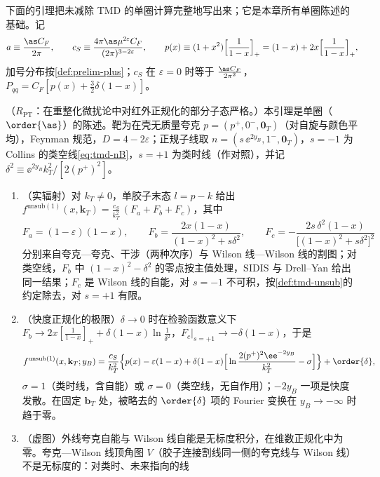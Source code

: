 下面的引理把未减除 TMD 的单圈计算完整地写出来；它是本章所有单圈陈述的基础。记
\begin{equation}\label{eq:tmd-oneloop-notation}
a\equiv\frac{\as C_F}{2\pi},\qquad c_S\equiv\frac{4\pi\as\mu^{2\varepsilon}C_F}{(2\pi)^{3-2\varepsilon}},\qquad p(x)\equiv(1+x^2)\Big[\frac1{1-x}\Big]_+=(1-x)+2x\Big[\frac1{1-x}\Big]_+ ,
\end{equation}
加号分布按\cref{def:prelim-plus}；$c_S$ 在 $\varepsilon=0$ 时等于 $\frac{\as C_F}{2\pi^2}$，$P_{qq}=C_F[p(x)+\frac32\delta(1-x)]$。

\begin{lemma}\label{lem:tmd-unsub-oneloop}
（$R_{\mathrm{PT}}$：在重整化微扰论中对红外正规化的部分子态严格。）本引理是单圈（$\order{\as}$）的陈述。靶为在壳无质量夸克 $p=(p^+,0^-,\mathbf 0_T)$（对自旋与颜色平均），Feynman 规范，$D=4-2\varepsilon$；正规子线取 $n=(s\,\ee^{2y_B},1^-,\mathbf 0_T)$，$s=-1$ 为 Collins 的类空线\cref{eq:tmd-nB}，$s=+1$ 为类时线（作对照），并记 $\delta^2\equiv\ee^{2y_B}k_T^2/[2(p^+)^2]$。
\begin{enumerate}[label=(\alph*),leftmargin=2.2em,itemsep=1pt,topsep=2pt]
\item（实辐射）对 $k_T\neq0$，单胶子末态 $l=p-k$ 给出 $f^{\mathrm{unsub}(1)}(x,\mathbf k_T)=\frac{c_S}{k_T^2}\,(F_a+F_b+F_c)$，其中
\begin{equation}\label{eq:tmd-real-graphs}
F_a=(1-\varepsilon)(1-x),\qquad F_b=\frac{2x(1-x)}{(1-x)^2+s\delta^2},\qquad F_c=-\frac{2s\,\delta^2(1-x)}{\big[(1-x)^2+s\delta^2\big]^2}
\end{equation}
分别来自夸克—夸克、干涉（两种次序）与 Wilson 线—Wilson 线的割图；对类空线，$F_b$ 中 $(1-x)^2-\delta^2$ 的零点按主值处理，SIDIS 与 Drell--Yan 给出同一结果；$F_c$ 是 Wilson 线的自能，对 $s=-1$ 不可积，按\cref{def:tmd-unsub}的约定除去，对 $s=+1$ 有限。
\item（快度正规化的极限）$\delta\to0$ 时在检验函数意义下 $F_b\to2x[\frac1{1-x}]_++\delta(1-x)\ln\frac1{\delta^2}$，$F_c|_{s=+1}\to-\delta(1-x)$，于是
\begin{equation}\label{eq:tmd-unsub-kspace}
f^{\mathrm{unsub}(1)}(x,\mathbf k_T;y_B)=\frac{c_S}{k_T^2}\Big\{p(x)-\varepsilon(1-x)+\delta(1-x)\Big[\ln\frac{2(p^+)^2\ee^{-2y_B}}{k_T^2}-\sigma\Big]\Big\}+\order{\delta},
\end{equation}
$\sigma=1$（类时线，含自能）或 $\sigma=0$（类空线，无自作用）；$-2y_B$ 一项是快度发散。在固定 $\mathbf b_T$ 处，被略去的 $\order{\delta}$ 项的 Fourier 变换在 $y_B\to-\infty$ 时趋于零。
\item（虚图）外线夸克自能与 Wilson 线自能是无标度积分，在维数正规化中为零。夸克—Wilson 线顶角图 $V$（胶子连接割线同一侧的夸克线与 Wilson 线）不是无标度的：对类时、未来指向的线

\end{enumerate}
\end{lemma}
